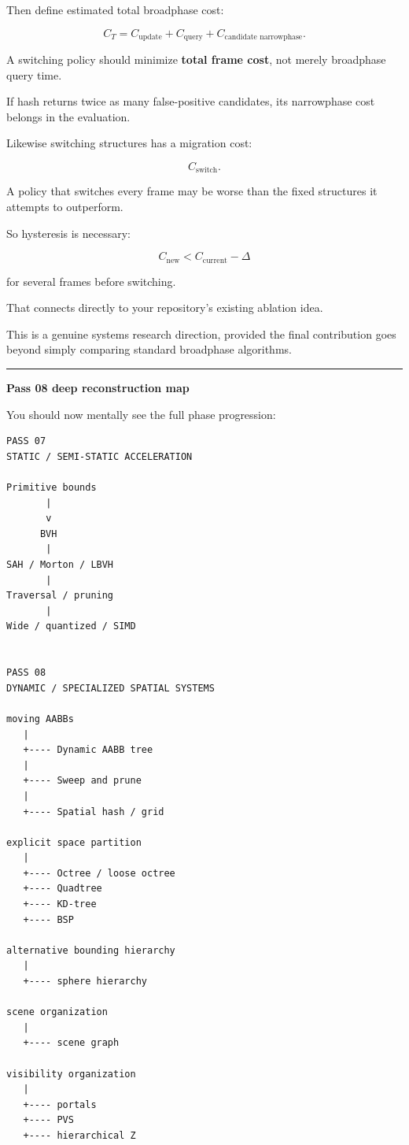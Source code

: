 Then define estimated total broadphase cost:

\[
C_T
=
C_{\text{update}}
+
C_{\text{query}}
+
C_{\text{candidate narrowphase}}.
\]

A switching policy should minimize \textbf{total frame cost}, not merely broadphase query time.

If hash returns twice as many false-positive candidates, its narrowphase cost belongs in the evaluation.

Likewise switching structures has a migration cost:

\[
C_{\text{switch}}.
\]

A policy that switches every frame may be worse than the fixed structures it attempts to outperform.

So hysteresis is necessary:

\[
C_{\text{new}}
<
C_{\text{current}}-\Delta
\]

for several frames before switching.

That connects directly to your repository's existing  ablation idea.

This is a genuine systems research direction, provided the final contribution goes beyond simply comparing standard broadphase algorithms.

\begin{center}\rule{0.5\linewidth}{0.5pt}\end{center}

\textbf{Pass 08 deep reconstruction map}

You should now mentally see the full phase progression:

\begin{verbatim}
PASS 07
STATIC / SEMI-STATIC ACCELERATION

Primitive bounds
       |
       v
      BVH
       |
SAH / Morton / LBVH
       |
Traversal / pruning
       |
Wide / quantized / SIMD


PASS 08
DYNAMIC / SPECIALIZED SPATIAL SYSTEMS

moving AABBs
   |
   +---- Dynamic AABB tree
   |
   +---- Sweep and prune
   |
   +---- Spatial hash / grid

explicit space partition
   |
   +---- Octree / loose octree
   +---- Quadtree
   +---- KD-tree
   +---- BSP

alternative bounding hierarchy
   |
   +---- sphere hierarchy

scene organization
   |
   +---- scene graph

visibility organization
   |
   +---- portals
   +---- PVS
   +---- hierarchical Z
\end{verbatim}

